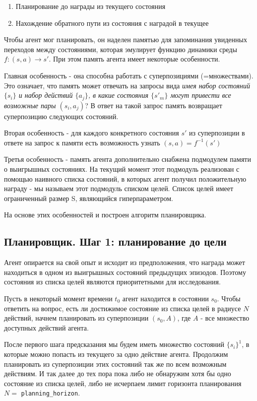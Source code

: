 \documentclass[a4paper]{article}
\begin{document}
\begin{enumerate}
    \item Планирование до награды из текущего состояния
    \item Нахождение обратного пути из состояния с наградой в текущее
\end{enumerate}

Чтобы агент мог планировать, он наделен памятью для запоминания увиденных переходов между состояниями, которая эмулирует функцию динамики среды $f: (s, a) \rightarrow s'$. При этом память агента имеет некоторые особенности.

Главная особенность - она способна работать с суперпозициями (=множествами). Это означает, что память может отвечать на запросы вида \textit{имея набор состояний $\{s_i\}$ и набор действий $\{a_j\}$, в какие состояния $\{s'_m\}$ могут привести все возможные пары $(s_i, a_j)$}? В ответ на такой запрос память возвращает суперпозицию следующих состояний.

Вторая особенность - для каждого конкретного состояния $s'$ из суперпозиции в ответе на запрос к памяти есть возможность узнать $(s, a) = f^{-1}(s')$

Третья особенность - память агента дополнительно снабжена подмодулем памяти о выигрышных состояниях. На текущий момент этот подмодуль реализован с помощью наивного списка состояний, в которых агент получил положительную награду - мы называем этот подмодуль списком целей. Список целей имеет ограниченный размер S, являющийся гиперпараметром.

На основе этих особенностей и построен алгоритм планировщика.

\subsection{Планировщик. Шаг 1: планирование до цели}

Агент опирается на свой опыт и исходит из предположения, что награда может находиться в одном из выигрышных состояний предыдущих эпизодов. Поэтому состояния из списка целей являются приоритетными для исследования.

Пусть в некоторый момент времени $t_0$ агент находится в состоянии $s_0$. Чтобы ответить на вопрос, есть ли достижимое состояние из списка целей в радиусе $N$ действий, начнем планировать из суперпозиции $(s_0, A)$, где $A$ - все множество доступных действий агента.

После первого шага предсказания мы будем иметь множество состояний $\{s_i\}^1$, в которые можно попасть из текущего за одно действие агента. Продолжим планировать из суперпозиции этих состояний так же по всем возможным действиям. И так далее до тех пора пока либо не обнаружим хотя бы одно состояние из списка целей, либо не исчерпаем лимит горизонта планирования $N =$ \verb|planning_horizon|.
\end{document}
